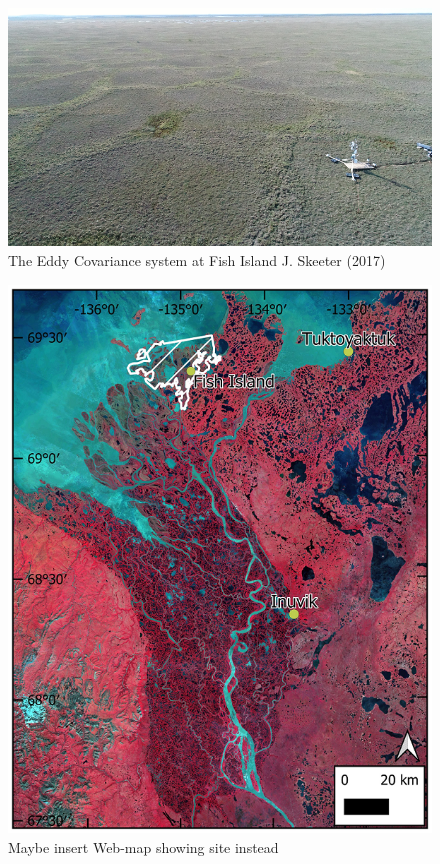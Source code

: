 \documentclass[
]{book}
\begin{document}
\begin{figure}
\centering
\includegraphics{images/16-ec-site.png}
\caption{The Eddy Covariance system at Fish Island J. Skeeter (2017)}
\end{figure}

\begin{figure}
\centering
\includegraphics{images/16-fig1.png}
\caption{Maybe insert Web-map showing site instead}
\end{figure}
\end{document}
